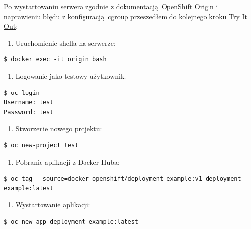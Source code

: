 \documentclass[a4paper,12pt,twoside,openany]{report}
\providecommand{\tightlist}{%
  \setlength{\itemsep}{0pt}\setlength{\parskip}{0pt}}
\begin{document}
Po wystartowaniu serwera zgodnie z dokumentacją~OpenShift Origin i
naprawieniu błędu z konfiguracją~cgroup przeszedłem do kolejnego kroku
\href{https://docs.openshift.org/latest/getting_started/administrators.html\#try-it-out}{Try
It Out}:

\begin{enumerate}
\def\labelenumi{\arabic{enumi}.}
\tightlist
\item
  Uruchomienie shella na serwerze:
\end{enumerate}

\begin{lstlisting}
$ docker exec -it origin bash
\end{lstlisting}

\begin{enumerate}
\def\labelenumi{\arabic{enumi}.}
\setcounter{enumi}{1}
\tightlist
\item
  Logowanie jako testowy użytkownik:
\end{enumerate}

\begin{lstlisting}
$ oc login
Username: test
Password: test
\end{lstlisting}

\begin{enumerate}
\def\labelenumi{\arabic{enumi}.}
\setcounter{enumi}{2}
\tightlist
\item
  Stworzenie nowego projektu:
\end{enumerate}

\begin{lstlisting}
$ oc new-project test
\end{lstlisting}

\begin{enumerate}
\def\labelenumi{\arabic{enumi}.}
\setcounter{enumi}{3}
\tightlist
\item
  Pobranie aplikacji z Docker Huba:
\end{enumerate}

\begin{lstlisting}
$ oc tag --source=docker openshift/deployment-example:v1 deployment-example:latest
\end{lstlisting}

\begin{enumerate}
\def\labelenumi{\arabic{enumi}.}
\setcounter{enumi}{4}
\tightlist
\item
  Wystartowanie aplikacji:
\end{enumerate}

\begin{lstlisting}
$ oc new-app deployment-example:latest
\end{lstlisting}
\end{document}
